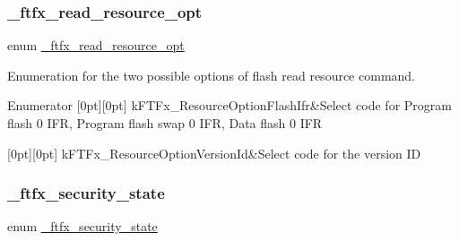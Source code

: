 \subsubsection{\texorpdfstring{\_ftfx\_read\_resource\_opt}{\_ftfx\_read\_resource\_opt}}
{\footnotesize\ttfamily enum \mbox{\hyperlink{group__ftfx__controller_gad6557da8fe12a2fd572ace03395c3fd8}{\+\_\+ftfx\+\_\+read\+\_\+resource\+\_\+opt}}}



Enumeration for the two possible options of flash read resource command. 

\begin{DoxyEnumFields}{Enumerator}
[0pt][0pt]{}\mbox{\label{group__ftfx__controller_ggad6557da8fe12a2fd572ace03395c3fd8aa11a2c42a2eba3c730c8832296cd450b}} 
k\+F\+T\+Fx\+\_\+\+Resource\+Option\+Flash\+Ifr&Select code for Program flash 0 I\+FR, Program flash swap 0 I\+FR, Data flash 0 I\+FR \\
\hline

[0pt][0pt]{}\mbox{\label{group__ftfx__controller_ggad6557da8fe12a2fd572ace03395c3fd8a531ca4c2d12cec0d61b983f4eaae4c8a}} 
k\+F\+T\+Fx\+\_\+\+Resource\+Option\+Version\+Id&Select code for the version ID \\
\hline

\end{DoxyEnumFields}
\mbox{\label{group__ftfx__controller_ga0b42dbcfacb9ac0da48c674dd6a35f2f}} 
\subsubsection{\texorpdfstring{\_ftfx\_security\_state}{\_ftfx\_security\_state}}
{\footnotesize\ttfamily enum \mbox{\hyperlink{group__ftfx__controller_ga0b42dbcfacb9ac0da48c674dd6a35f2f}{\+\_\+ftfx\+\_\+security\+\_\+state}}}




